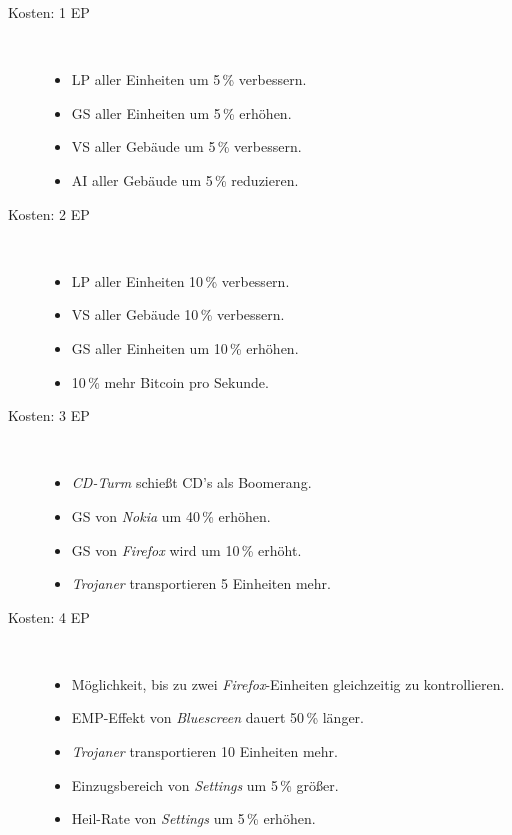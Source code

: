 \begin{description}
  \item[Kosten: 1 EP]~
    \begin{itemize}[nosep, leftmargin=0.2cm]
      \item LP aller Einheiten um 5\,\% verbessern.
      \item GS aller Einheiten um 5\,\% erhöhen.
      \item VS aller Gebäude um 5\,\% verbessern.
      \item AI aller Gebäude um 5\,\% reduzieren.
    \end{itemize}

  \item[Kosten: 2 EP]~
    \begin{itemize}[nosep, leftmargin=0.2cm]
      \item LP aller Einheiten 10\,\% verbessern.
      \item VS aller Gebäude 10\,\% verbessern.
      \item GS aller Einheiten um 10\,\% erhöhen.
      \item 10\,\% mehr Bitcoin pro Sekunde.
    \end{itemize}

  \item[Kosten: 3 EP]~
    \begin{itemize}[nosep, leftmargin=0.2cm]
      \item \emph{CD-Turm} schießt CD's als Boomerang.
	    \item GS von \emph{Nokia} um 40\,\% erhöhen.
	    \item GS von \emph{Firefox} wird um 10\,\% erhöht.
	    \item \emph{Trojaner} transportieren 5 Einheiten mehr.

    \end{itemize}

  \item[Kosten: 4 EP]~
    \begin{itemize}[nosep, leftmargin=0.2cm]
      \item Möglichkeit, bis zu zwei \emph{Firefox}-Einheiten gleichzeitig zu
        kontrollieren.
	    \item EMP-Effekt von \emph{Bluescreen} dauert 50\,\% länger.
	    \item \emph{Trojaner} transportieren 10 Einheiten mehr.
	    \item Einzugsbereich von \emph{Settings} um 5\,\% größer.
	    \item Heil-Rate von \emph{Settings} um 5\,\% erhöhen.


\end{itemize}
\end{description}
